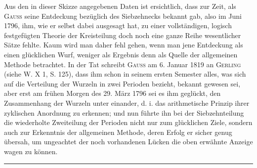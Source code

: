 Aus den in dieser Skizze angegebenen Daten ist ersichtlich, dass zur Zeit, als \textsc{Gauss} seine Entdeckung bezüglich des Siebzehnecks bekannt gab, also im Juni 1796, ihm, wie er selbst dabei ausgesagt hat, zu einer vollständigen, logisch festgefügten Theorie der Kreisteilung doch noch eine ganze Reihe wesentlicher Sätze fehlte. Kaum wird man daher fehl gehen, wenn man jene Entdeckung als einen glücklichen Wurf, weniger als Ergebnis denn als Quelle der allgemeinen Methode betrachtet. In der Tat schreibt \textsc{Gauss} am 6. Januar 1819 an \textsc{Gerling} (siehe W. X 1, S. 125), dass ihm schon in seinem ersten Semester alles, was sich auf die Verteilung der Wurzeln in zwei Perioden bezieht, bekannt gewesen sei, aber erst am frühen Morgen des 29. März 1796 sei es ihm geglückt, den Zusammenhang der Wurzeln unter einander, d. i. das arithmetische Prinzip ihrer zyklischen Anordnung zu erkennen; und nun führte ihn bei der Siebzehnteilung die wiederholte Zweiteilung der Perioden nicht nur zum glücklichen Ziele, sondern auch zur Erkenntnis der allgemeinen Methode, deren Erfolg er sicher genug übersah, um ungeachtet der noch vorhandenen Lücken die oben erwähnte Anzeige wagen zu können.
\begin{center}\rule{.18\textwidth}{.3pt}\end{center}
